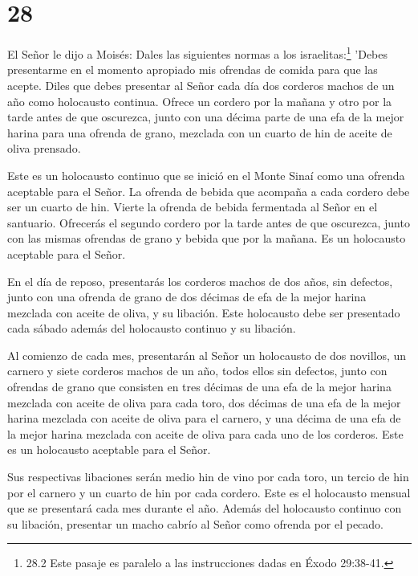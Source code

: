 \hypertarget{section-27}{%
\section{28}\label{section-27}}

 El Señor le dijo a Moisés:  Dales las
siguientes normas a los israelitas:\footnote{28.2 Este pasaje es
  paralelo a las instrucciones dadas en Éxodo 29:38-41.} 'Debes
presentarme en el momento apropiado mis ofrendas de comida para que las
acepte.  Diles que debes presentar al Señor cada día dos
corderos machos de un año como holocausto continua.  Ofrece
un cordero por la mañana y otro por la tarde antes de que oscurezca,
 junto con una décima parte de una efa de la mejor harina
para una ofrenda de grano, mezclada con un cuarto de hin de aceite de
oliva prensado.

 Este es un holocausto continuo que se inició en el Monte
Sinaí como una ofrenda aceptable para el Señor.  La ofrenda
de bebida que acompaña a cada cordero debe ser un cuarto de hin. Vierte
la ofrenda de bebida fermentada al Señor en el santuario. 
Ofrecerás el segundo cordero por la tarde antes de que oscurezca, junto
con las mismas ofrendas de grano y bebida que por la mañana. Es un
holocausto aceptable para el Señor.

 En el día de reposo, presentarás los corderos machos de dos
años, sin defectos, junto con una ofrenda de grano de dos décimas de efa
de la mejor harina mezclada con aceite de oliva, y su libación.
 Este holocausto debe ser presentado cada sábado además del
holocausto continuo y su libación.

 Al comienzo de cada mes, presentarán al Señor un
holocausto de dos novillos, un carnero y siete corderos machos de un
año, todos ellos sin defectos,  junto con ofrendas de grano
que consisten en tres décimas de una efa de la mejor harina mezclada con
aceite de oliva para cada toro, dos décimas de una efa de la mejor
harina mezclada con aceite de oliva para el carnero,  y una
décima de una efa de la mejor harina mezclada con aceite de oliva para
cada uno de los corderos. Este es un holocausto aceptable para el Señor.

 Sus respectivas libaciones serán medio hin de vino por
cada toro, un tercio de hin por el carnero y un cuarto de hin por cada
cordero. Este es el holocausto mensual que se presentará cada mes
durante el año.  Además del holocausto continuo con su
libación, presentar un macho cabrío al Señor como ofrenda por el pecado.

